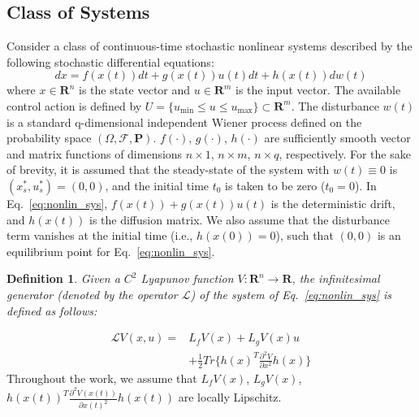 \documentclass[letterpaper, 10pt, conference]{ieeeconf}
\newtheorem{definition}{Definition}
\begin{document}
	\subsection{Class of Systems}
	Consider a class of continuous-time stochastic nonlinear systems described by the following stochastic differential equations:
	\begin{equation}
	\label{eq:nonlin_sys}
	d{x} = f(x(t))dt+g(x(t))u(t)dt +h(x(t))dw(t)
	\end{equation}
	where $x \in \mathbf{R}^n$ is the state vector and $u \in \mathbf{R}^m$ is the input vector. The available control action is defined by $U = \{u_{\min} \leq u \leq u_{\max}\} \subset \mathbf{R}^m$. The disturbance $w(t)$ is a standard q-dimensional independent Wiener process defined on the probability space $(\Omega, \mathcal{F}, \mathbf{P})$. $f(\cdot)$, $g(\cdot)$, $h(\cdot)$ are sufficiently smooth vector and matrix functions of dimensions $n \times 1$, $n \times m$, $n \times q$, respectively. For the sake of brevity, it is assumed that the steady-state of the system with $w(t) \equiv 0$ is $(x_s^*, u_s^*)=(0,0)$, and the initial time $t_0$ is taken to be zero ($t_0 = 0$). In Eq.~\ref{eq:nonlin_sys}, $f(x(t))+g(x(t))u(t)$ is the deterministic drift, and $h(x(t))$ is the diffusion matrix. We also assume that the disturbance term vanishes at the initial time (i.e., $h(x(0))=0$), such that $(0, 0)$ is an equilibrium point for Eq.~\ref{eq:nonlin_sys}.
	
	\begin{definition}
		Given a $C^2$ Lyapunov function $V : \mathbf{R}^n \rightarrow \mathbf{R}$, the infinitesimal generator (denoted by the operator $\mathcal{L}$) of the system of Eq.~\ref{eq:nonlin_sys} is defined as follows:
	\end{definition}
	\begin{equation}\label{eq:generator}
	\begin{split}
	\mathcal{L}V(x,u)=&L_fV(x)+L_gV(x)u\\
	&+\frac{1}{2} Tr\{h(x)^T\frac{\partial^2 V}{\partial x^2}h(x)\}
	\end{split}
	\end{equation}
Throughout the work, we assume that $L_fV(x)$, $L_gV(x)$, $h(x(t))^T \frac{\partial^2V(x(t))}{\partial x(t)^2}h(x(t))$ are locally Lipschitz.

\vspace{0.3cm}
\end{document}
